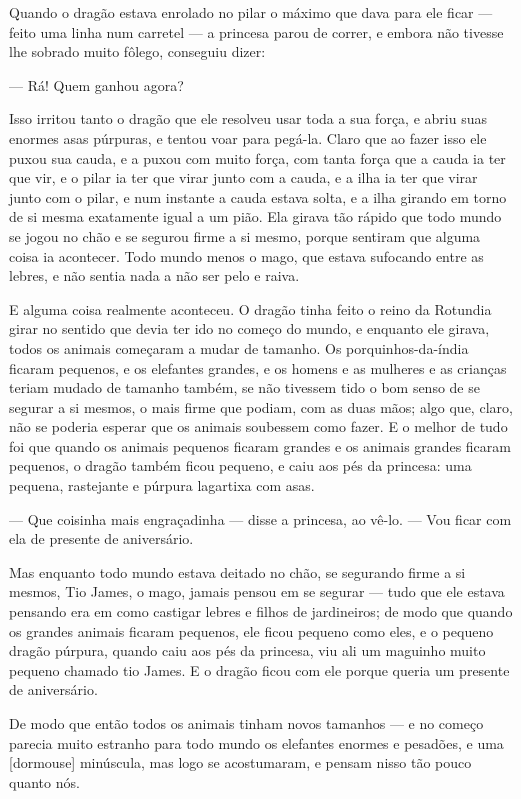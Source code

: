 Quando o dragão estava enrolado no pilar o máximo que dava para ele
ficar — feito uma linha num carretel — a princesa parou de correr, e
embora não tivesse lhe sobrado muito fôlego, conseguiu dizer:

— Rá! Quem ganhou agora?

Isso irritou tanto o dragão que ele resolveu usar toda a sua força, e
abriu suas enormes asas púrpuras, e tentou voar para pegá-la. Claro
que ao fazer isso ele puxou sua cauda, e a puxou com muito força, com
tanta força que a cauda ia ter que vir, e o pilar ia ter que virar
junto com a cauda, e a ilha ia ter que virar junto com o pilar, e num
instante a cauda estava solta, e a ilha girando em torno de si mesma
exatamente igual a um pião. Ela girava tão rápido que todo mundo se
jogou no chão e se segurou firme a si mesmo, porque sentiram que
alguma coisa ia acontecer. Todo mundo menos o mago, que estava
sufocando entre as lebres, e não sentia nada a não ser pelo e raiva.

E alguma coisa realmente aconteceu. O dragão tinha feito o reino da
Rotundia girar no sentido que devia ter ido no começo do mundo, e
enquanto ele girava, todos os animais começaram a mudar de tamanho.
Os porquinhos-da-índia ficaram pequenos, e os elefantes grandes, e os
homens e as mulheres e as crianças teriam mudado de tamanho também,
se não tivessem tido o bom senso de se segurar a si mesmos, o mais
firme que podiam, com as duas mãos; algo que, claro, não se poderia
esperar que os animais soubessem como fazer. E o melhor de tudo foi
que quando os animais pequenos ficaram grandes e os animais grandes
ficaram pequenos, o dragão também ficou pequeno, e caiu aos pés da
princesa: uma pequena, rastejante e púrpura lagartixa com asas. 

— Que coisinha mais engraçadinha — disse a princesa, ao vê-lo. — Vou
ficar com ela de presente de aniversário. 

Mas enquanto todo mundo estava deitado no chão, se segurando firme a
si mesmos, Tio James, o mago, jamais pensou em se segurar — tudo que
ele estava pensando era em como castigar lebres e filhos de
jardineiros; de modo que quando os grandes animais ficaram pequenos,
ele ficou pequeno como eles, e o pequeno dragão púrpura, quando caiu
aos pés da princesa, viu ali um maguinho muito pequeno chamado tio
James. E o dragão ficou com ele porque queria um presente de
aniversário.

De modo que então todos os animais tinham novos tamanhos — e no começo
parecia muito estranho para todo mundo os elefantes enormes e
pesadões, e uma [dormouse] minúscula, mas logo se acostumaram, e
pensam nisso tão pouco quanto nós.

